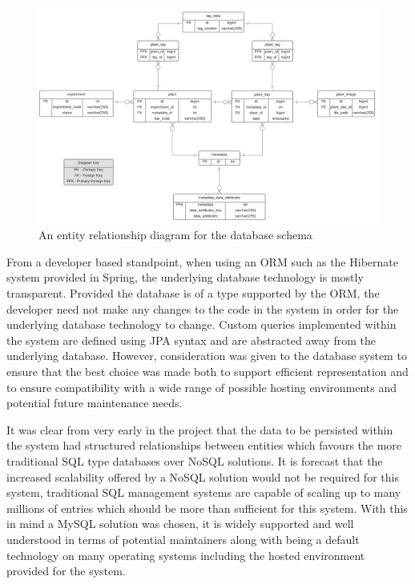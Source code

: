 \begin{figure}[H]
    \centering
    \includegraphics[width=\textwidth]{images/design/dbSchema}
    \caption{An entity relationship diagram for the database schema}
    \label{fig:dbSchema}
\end{figure}

From a developer based standpoint, when using an ORM such as the Hibernate system provided in Spring, the underlying database technology is mostly transparent. Provided the database is of a type supported by the ORM, the developer need not make any changes to the code in the system in order for the underlying database technology to change. Custom queries implemented within the system are defined using JPA syntax and are abstracted away from the underlying database. However, consideration was given to the database system to ensure that the best choice was made both to support efficient representation and to ensure compatibility with a wide range of possible hosting environments and potential future maintenance needs.

It was clear from very early in the project that the data to be persisted within the system had structured relationships between entities which favours the more traditional SQL type databases over NoSQL solutions. It is forecast that the increased scalability offered by a NoSQL solution would not be required for this system, traditional SQL management systems are capable of scaling up to many millions of entries which should be more than sufficient for this system. With this in mind a MySQL solution was chosen, it is widely supported and well understood in terms of potential maintainers along with being a default technology on many operating systems including the hosted environment provided for the system.

